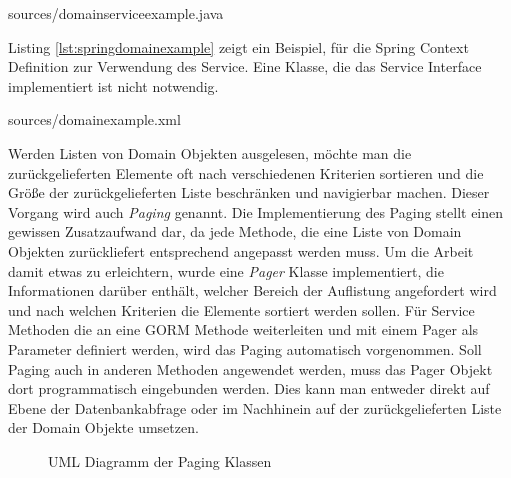 \lstset{language=Java}
 {sources/domainserviceexample.java}

Listing \ref{lst:springdomainexample} zeigt ein Beispiel, für die Spring
Context Definition zur Verwendung des Service. Eine Klasse, die das Service
Interface implementiert ist nicht notwendig.

\lstset{language=XML}
 {sources/domainexample.xml}

Werden Listen von Domain Objekten ausgelesen, möchte man die zurückgelieferten
Elemente oft nach verschiedenen Kriterien sortieren und die Größe der
zurückgelieferten Liste beschränken und navigierbar machen. Dieser Vorgang wird
auch \emph{Paging} genannt. Die Implementierung des Paging stellt einen gewissen
Zusatzaufwand dar, da jede Methode, die eine Liste von Domain Objekten
zurückliefert entsprechend angepasst werden muss. Um die Arbeit damit etwas zu
erleichtern, wurde eine \emph{Pager} Klasse implementiert, die Informationen
darüber enthält, welcher Bereich der Auflistung angefordert wird und nach welchen
Kriterien die Elemente sortiert werden sollen. Für Service Methoden die an eine
\ac{GORM} Methode weiterleiten und mit einem Pager als Parameter definiert
werden, wird das Paging automatisch vorgenommen. Soll Paging auch in anderen Methoden
angewendet werden, muss das Pager Objekt dort programmatisch eingebunden werden.
Dies kann man entweder direkt auf Ebene der Datenbankabfrage oder im Nachhinein auf
der zurückgelieferten Liste der Domain Objekte umsetzen.

\begin{figure}[bth]
	\caption{UML Diagramm der Paging Klassen}
\end{figure}

